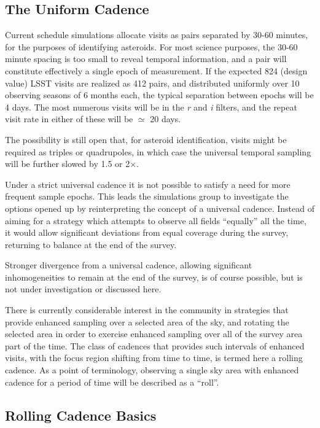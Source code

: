 \subsection{The Uniform Cadence}

Current schedule simulations allocate visits as pairs separated by 30-60 minutes, for the purposes of identifying asteroids.  For most science purposes, the 30-60 minute spacing is too small to reveal temporal information, and a pair will constitute effectively a single epoch of measurement.  If the expected 824 (design value) LSST visits are realized as 412 pairs, and distributed uniformly over 10 observing seasons of 6 months each, the typical separation between epochs will be 4 days.   The most numerous visits will be in the {\it r} and {\it i} filters, and the repeat visit rate in either of these will be $\simeq$ 20 days.

The possibility is still open that, for asteroid identification, visits might be required as triples or quadrupoles, in which case the universal temporal sampling will be further slowed by 1.5 or 2$\times$.

Under a strict universal cadence it is not possible to satisfy a need for more frequent sample epochs.  This leads the simulations group to investigate the options opened up by reinterpreting the concept of a universal cadence.  Instead of aiming for a strategy which attempts to observe all fields ``equally'' all the time, it would allow significant deviations from equal coverage during the survey, returning to balance at the end of the survey.

Stronger divergence from a universal cadence, allowing significant inhomogeneities to remain at the end of the survey, is of course possible, but is not under investigation or discussed here.

There is currently considerable interest in the community in strategies that provide enhanced sampling over a selected area of the sky, and rotating the selected area in order to exercise enhanced sampling over all of the survey area part of the time.  The class of cadences that provides such intervals of enhanced visits, with the focus region shifting from time to time, is termed here a rolling cadence.  As a point of terminology, observing a single sky area with enhanced cadence for a period of time will be described as a ``roll''.

\subsection{Rolling Cadence Basics}

